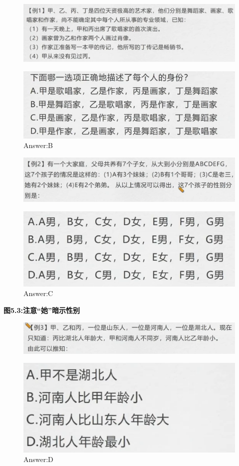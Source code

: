 \documentclass{article}
\numberwithin{equation}{section}						%
\numberwithin{figure}{section}							%
\begin{document}
\begin{sloppypar}
\begin{figure}[H]
     \centering
     \includegraphics[width=0.6\linewidth]{186.png}
\end{figure}

\begin{figure}[H]
     \centering
     \includegraphics[width=0.4\linewidth]{187.png}
		\caption{Answer:B}
\end{figure}



\begin{figure}[H]
     \centering
     \includegraphics[width=0.6\linewidth]{188.png}
\end{figure}

\begin{figure}[H]
     \centering
     \includegraphics[width=0.4\linewidth]{189.png}
		\caption{Answer:C}
\end{figure}

\textbf{图5.3:注意“她”暗示性别}

\begin{figure}[H]
     \centering
     \includegraphics[width=0.6\linewidth]{190.png}
\end{figure}

\begin{figure}[H]
     \centering
     \includegraphics[width=0.3\linewidth]{191.png}
		\caption{Answer:D}
\end{figure}


\end{sloppypar}
\end{document}
